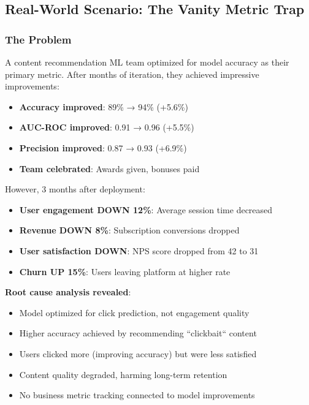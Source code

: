 \subsection{Real-World Scenario: The Vanity Metric Trap}

\subsubsection{The Problem}

A content recommendation ML team optimized for model accuracy as their primary metric. After months of iteration, they achieved impressive improvements:

\begin{itemize}
    \item \textbf{Accuracy improved}: 89\% → 94\% (+5.6\%)
    \item \textbf{AUC-ROC improved}: 0.91 → 0.96 (+5.5\%)
    \item \textbf{Precision improved}: 0.87 → 0.93 (+6.9\%)
    \item \textbf{Team celebrated}: Awards given, bonuses paid
\end{itemize}

However, 3 months after deployment:

\begin{itemize}
    \item \textbf{User engagement DOWN 12\%}: Average session time decreased
    \item \textbf{Revenue DOWN 8\%}: Subscription conversions dropped
    \item \textbf{User satisfaction DOWN}: NPS score dropped from 42 to 31
    \item \textbf{Churn UP 15\%}: Users leaving platform at higher rate
\end{itemize}

\textbf{Root cause analysis revealed}:
\begin{itemize}
    \item Model optimized for click prediction, not engagement quality
    \item Higher accuracy achieved by recommending ``clickbait`` content
    \item Users clicked more (improving accuracy) but were less satisfied
    \item Content quality degraded, harming long-term retention
    \item No business metric tracking connected to model improvements
\end{itemize}

